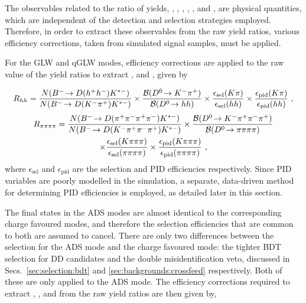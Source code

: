 The \CP observables related to the ratio of yields, \Rkk, \Rpipi, \Rptwo, \Rmtwo, \Rpipipipi, \Rpfour and \Rmfour, are physical quantities, which are independent of the detection and selection strategies employed. Therefore, in order to extract these \CP observables from the raw yield ratios, various efficiency corrections, taken from simulated signal samples, must be applied.

For the GLW and qGLW modes, efficiency corrections are applied to the raw value of the yield ratios to extract \Rkk, \Rpipi and \Rpipipipi, given by 

{\footnotesize
\begin{equation}
R_{hh} = \frac{N({{{B}^-}}\!\rightarrow {\ensuremath{D}}(h^+h^-){{K}^{*-}})}{N({{{B}^-}}\!\rightarrow {\ensuremath{D}}({{K}^-}{{\pi}^+}){{K}^{*-}})} \times \frac{{\mathcal{B}}({{D}^0}\!\rightarrow {\ensuremath{{K}^-}}{\ensuremath{{\pi}^+}})}{{\mathcal{B}}({{D}^0}\!\rightarrow hh)} \times \frac{\epsilon_{\text{sel}}(K\pi)}{\epsilon_{\text{sel}}(hh)} \times \frac{\epsilon_{\text{pid}}(K\pi)}{\epsilon_{\text{pid}}(hh)} \text{ ,}
\label{effcorrectionglw2body}
\end{equation}
\begin{multline}
R_{\pi\pi\pi\pi} = \frac{N({{{B}^-}}\!\rightarrow {\ensuremath{D}}({{\pi}^+}{{\pi}^-}{{\pi}^+}{{\pi}^-}){{K}^{*-}})}{N({{{B}^-}}\!\rightarrow {\ensuremath{D}}({{K}^-}{{\pi}^+}{{\pi}^-}{{\pi}^+}){{K}^{*-}})} \times \frac{{\mathcal{B}}({{D}^0}\!\rightarrow {\ensuremath{{K}^-}}{\ensuremath{{\pi}^+}}{\ensuremath{{\pi}^-}}{\ensuremath{{\pi}^+}})}{{\mathcal{B}}({{D}^0}\!\rightarrow \pi\pi\pi\pi)} \\ \times \frac{\epsilon_{\text{sel}}(K\pi\pi\pi)}{\epsilon_{\text{sel}}(\pi\pi\pi\pi)} \times \frac{\epsilon_{\text{pid}}(K\pi\pi\pi)}{\epsilon_{\text{pid}}(\pi\pi\pi\pi)} \text{ ,}
\label{effcorrectionglw4body}
\end{multline}}%
where $\epsilon_{\text{sel}}$ and $\epsilon_{\text{pid}}$ are the selection and PID efficiencies respectively. Since PID variables are poorly modelled in the \lhcb simulation, a separate, data-driven method for determining PID efficiencies is employed, as detailed later in this section.

The final states in the ADS modes are almost identical to the corresponding charge favoured modes, and therefore the selection efficiencies that are common to both are assumed to cancel. There are only two differences between the selection for the ADS mode and the charge favoured mode: the tighter BDT selection for DD candidates and the double misidentification veto, discussed in Secs.~\ref{sec:selection:bdt} and \ref{sec:backgrounds:crossfeed} respectively. Both of these are only applied to the ADS mode. The efficiency corrections required to extract \Rptwo, \Rmtwo, \Rpfour and \Rmfour from the raw yield ratios are then given by, 

